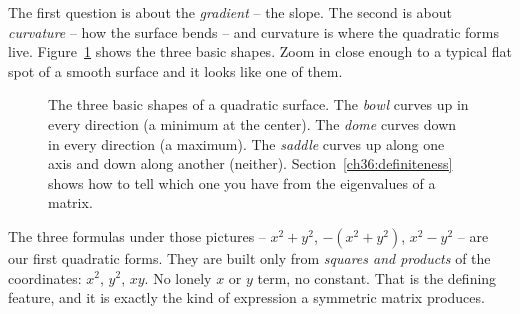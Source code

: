 The first question is about the \emph{gradient} -- the slope. The second is about
\emph{curvature} -- how the surface bends -- and curvature is where the quadratic
forms live. Figure~\ref{ch36:fig-three-shapes} shows the three basic shapes. Zoom in
close enough to a typical flat spot of a smooth surface and it looks like one of them.

\begin{figure}[H]
\centering
{}
\hspace{0.1cm}
\hspace{0.1cm}
\caption{The three basic shapes of a quadratic surface. The \emph{bowl} curves up
in every direction (a minimum at the center). The \emph{dome} curves down in every
direction (a maximum). The \emph{saddle} curves up along one axis and down along
another (neither). Section~\ref{ch36:definiteness} shows how to tell which one you
have from the eigenvalues of a matrix.}
\label{ch36:fig-three-shapes}
\end{figure}

The three formulas under those pictures -- $x^2+y^2$, $-(x^2+y^2)$, $x^2-y^2$ -- are
our first quadratic forms. They are built only from \emph{squares and
products} of the coordinates: $x^2$, $y^2$, $xy$. No lonely $x$ or $y$ term, no
constant. That is the defining feature, and it is exactly the kind of expression a
symmetric matrix produces.

